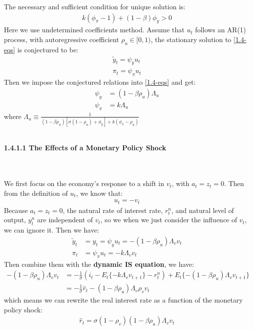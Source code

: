 \documentclass{article}
\numberwithin{equation}{section}
\begin{document}
The necessary and sufficient condition for unique solution is:
	\begin{align*}
		k(\phi_\pi - 1) + (1 - \beta)\phi_y > 0
	\end{align*}
Here we use undetermined coefficients method. Assume that $u_t$ follows an AR(1) process, with autoregressive coefficient $\rho_u \in [0, 1)$, the stationary solution to \eqref{1.4-eqs} is conjectured to be:
	\begin{align*}
		\tilde{y}_t = \psi_y u_t\\
		\pi_t = \psi_\pi u_t
	\end{align*}
Then we impose the conjectured relations into \eqref{1.4-eqs} and get:
	\begin{align*}
		\psi_y &= (1 - \beta \rho_u) \Lambda_u\\
		\psi_\pi &= k \Lambda_u
	\end{align*} 
where $\Lambda_u \equiv \frac{1}{(1 - \beta \rho_u)[\sigma(1 - \rho_u) + \phi_y] + k(\phi_\pi - \rho_u)}$\\\\
\centerline{\textbf{1.4.1.1 The Effects of a Monetary Policy Shock}}\\\\
We first focus on the economy's response to a shift in $v_t$, with $a_t = z_t = 0$. Then from the definition of $u_t$, we know that:
	\begin{align*}
		u_t = -v_t
	\end{align*}
Because $a_t = z_t = 0$, the natural rate of interest rate, $r^n_t$, and natural level of output, $y^n_t$ are independent of $v_t$, so we when we just consider the influence of $v_t$, we can ignore it. Then we have:
	\begin{align*}
		\tilde{y}_t &= y_t = \psi_y u_t = -(1 - \beta \rho_u) \Lambda_v v_t\\
		\pi_t &= \psi_\pi u_t = -k\Lambda_v v_t
	\end{align*}
Then combine them with the \textbf{dynamic IS equation}, we have:
	\begin{align*}
		-(1 - \beta \rho_u) \Lambda_v v_t &= -\frac{1}{\sigma}(i_t - E_t\{-k\Lambda_v v_{t+1}\} - r^n_t) + E_t\{-(1 - \beta \rho_u) \Lambda_v v_{t+1}\}\\
		&= -\frac{1}{\sigma}\hat{r}_t - (1 - \beta\rho_u)\Lambda_v\rho_v v_t
	\end{align*} 
which means we can rewrite the real interest rate as a function of the monetary policy shock:
	\begin{align*}
		\hat{r}_t = \sigma (1 - \rho_v)(1 - \beta\rho_u)\Lambda_v v_t
	\end{align*}
\end{document}
